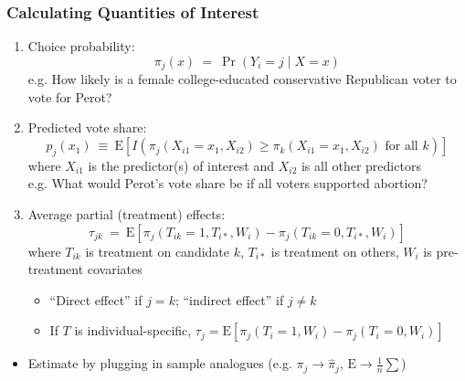 \documentclass{beamer}
\begin{document}
\begin{frame}
\frametitle{Calculating Quantities of Interest}
\small
\vspace{-.5\baselineskip}
\begin{enumerate}
\item \alert{Choice probability}:
$$ \pi_j(x) \ = \ \Pr(Y_i=j\mid X=x) $$
e.g. How likely is a female college-educated conservative Republican voter to vote for Perot?
\pause
\item \alert{Predicted vote share}:
$$ p_j(x_1) \ \equiv \ \text{E}\left[I\left(\pi_j(X_{i1}=x_1, X_{i2}) \geq \pi_k(X_{i1}=x_1, X_{i2})
 \text{ for all } k\right) \right] $$
where $X_{i1}$ is the predictor(s) of interest and $X_{i2}$ is all other predictors \\
\smallskip
e.g. What would Perot's vote share be if all voters supported abortion?
\pause
\item \alert{Average partial (treatment) effects}:
$$ \tau_{jk} \ = \ \text{E}\left[\pi_j(T_{ik}=1, T_{i\ast}, W_i) - \pi_j(T_{ik}=0, T_{i\ast}, W_i) \right] $$
where $T_{ik}$ is treatment on candidate $k$, $T_{i\ast}$ is treatment on others, $W_i$ is pre-treatment covariates
	\begin{itemize}
	\item ``Direct effect'' if $j=k$; ``indirect effect'' if $j\neq k$
	\item If $T$ is individual-specific, $\tau_j = \text{E}[\pi_j(T_i=1,W_i)-\pi_j(T_i=0,W_i)]$
	\end{itemize}
\end{enumerate}
\pause
\vspace{-.5\baselineskip}
\begin{itemize}
\item Estimate by plugging in sample analogues (e.g. $\pi_j \to \hat\pi_j$, $\text{E} \to \frac{1}{n}\sum$)
\end{itemize}

\end{frame}
\end{document}
